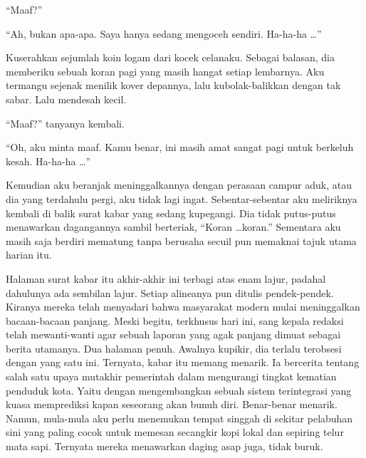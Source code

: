 \documentclass[smalldemyvopaper,11pt,twoside,onecolumn,openright,extrafontsizes]{memoir}
\begin{document}
``Maaf?''

``Ah, bukan apa-apa. Saya hanya sedang mengoceh sendiri. Ha-ha-ha \dots''

Kuserahkan sejumlah koin logam dari kocek celanaku. Sebagai balasan, dia memberiku sebuah koran pagi yang masih hangat setiap lembarnya. Aku termangu sejenak menilik kover depannya, lalu kubolak-balikkan dengan tak sabar. Lalu mendesah kecil.

``Maaf?'' tanyanya kembali.


``Oh, aku minta maaf. Kamu benar, ini masih amat sangat pagi untuk berkeluh kesah. Ha-ha-ha \dots''


Kemudian aku beranjak meninggalkannya dengan perasaan campur aduk, atau dia yang terdahulu pergi, aku tidak lagi ingat. Sebentar-sebentar aku meliriknya kembali di balik surat kabar yang sedang kupegangi. Dia tidak putus-putus menawarkan dagangannya sambil berteriak, ``Koran \dots koran.'' Sementara aku masih saja berdiri mematung tanpa berusaha secuil pun memaknai tajuk utama harian itu.


Halaman surat kabar itu akhir-akhir ini terbagi atas enam lajur, padahal dahulunya ada sembilan lajur. Setiap alineanya pun ditulis pendek-pendek. Kiranya mereka telah menyadari bahwa masyarakat modern mulai meninggalkan bacaan-bacaan panjang. Meski begitu, terkhusus hari ini, sang kepala redaksi telah mewanti-wanti agar sebuah laporan yang agak panjang dimuat sebagai berita utamanya. Dua halaman penuh. Awalnya kupikir, dia terlalu terobsesi dengan yang satu ini. Ternyata, kabar itu memang menarik. Ia bercerita tentang salah satu upaya mutakhir pemerintah dalam mengurangi tingkat kematian penduduk kota. Yaitu dengan mengembangkan sebuah sistem terintegrasi yang kuasa memprediksi kapan seseorang akan bunuh diri. Benar-benar menarik. Namun, mula-mula aku perlu menemukan tempat singgah di sekitar pelabuhan sini yang paling cocok untuk memesan secangkir kopi lokal dan sepiring telur mata sapi. Ternyata mereka menawarkan daging asap juga, tidak buruk.

\end{document}
